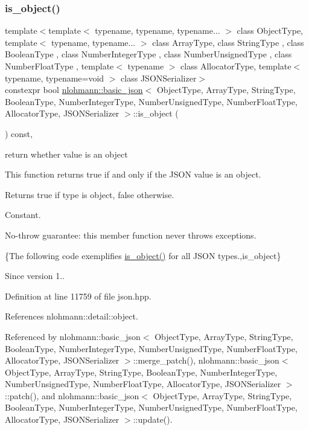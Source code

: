 \subsubsection{\texorpdfstring{is\+\_\+object()}{is\_object()}}
{\footnotesize\ttfamily template$<$template$<$ typename, typename, typename... $>$ class Object\+Type, template$<$ typename, typename... $>$ class Array\+Type, class String\+Type , class Boolean\+Type , class Number\+Integer\+Type , class Number\+Unsigned\+Type , class Number\+Float\+Type , template$<$ typename $>$ class Allocator\+Type, template$<$ typename, typename=void $>$ class J\+S\+O\+N\+Serializer$>$ \\
constexpr bool \hyperlink{classnlohmann_1_1basic__json}{nlohmann\+::basic\+\_\+json}$<$ Object\+Type, Array\+Type, String\+Type, Boolean\+Type, Number\+Integer\+Type, Number\+Unsigned\+Type, Number\+Float\+Type, Allocator\+Type, J\+S\+O\+N\+Serializer $>$\+::is\+\_\+object (\begin{DoxyParamCaption}{ }\end{DoxyParamCaption}) const\hspace{0.3cm}{\ttfamily [inline]}, {\ttfamily [noexcept]}}



return whether value is an object 

This function returns true if and only if the J\+S\+ON value is an object.

\begin{DoxyReturn}{Returns}
{\ttfamily true} if type is object, {\ttfamily false} otherwise.
\end{DoxyReturn}
Constant.

No-\/throw guarantee\+: this member function never throws exceptions.

\{The following code exemplifies {\ttfamily \hyperlink{classnlohmann_1_1basic__json_af8f511af124e82e4579f444b4175787c}{is\+\_\+object()}} for all J\+S\+ON types.,is\+\_\+object\}

\begin{DoxySince}{Since}
version 1.. 
\end{DoxySince}


Definition at line 11759 of file json.\+hpp.



References nlohmann\+::detail\+::object.



Referenced by nlohmann\+::basic\+\_\+json$<$ Object\+Type, Array\+Type, String\+Type, Boolean\+Type, Number\+Integer\+Type, Number\+Unsigned\+Type, Number\+Float\+Type, Allocator\+Type, J\+S\+O\+N\+Serializer $>$\+::merge\+\_\+patch(), nlohmann\+::basic\+\_\+json$<$ Object\+Type, Array\+Type, String\+Type, Boolean\+Type, Number\+Integer\+Type, Number\+Unsigned\+Type, Number\+Float\+Type, Allocator\+Type, J\+S\+O\+N\+Serializer $>$\+::patch(), and nlohmann\+::basic\+\_\+json$<$ Object\+Type, Array\+Type, String\+Type, Boolean\+Type, Number\+Integer\+Type, Number\+Unsigned\+Type, Number\+Float\+Type, Allocator\+Type, J\+S\+O\+N\+Serializer $>$\+::update().


